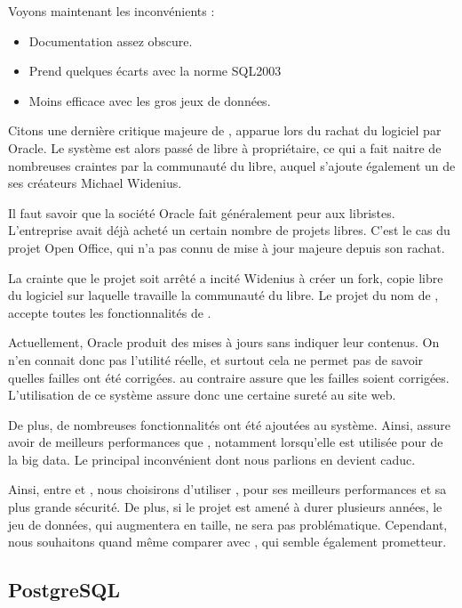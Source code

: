 Voyons maintenant les inconvénients :

\begin{itemize}
\item Documentation assez obscure. 
\item Prend quelques écarts avec la norme SQL2003
\item Moins efficace avec les gros jeux de données. 
\end{itemize} 

Citons une dernière critique majeure de \mysql, apparue lors du rachat du logiciel par Oracle. Le système est alors  passé de libre à propriétaire, ce qui  a fait naitre de nombreuses craintes par la communauté du libre, auquel s'ajoute également un de ses créateurs Michael Widenius. 

Il faut savoir que la société Oracle fait généralement peur aux libristes. L'entreprise avait déjà acheté un certain nombre de projets libres. C'est le cas du projet Open Office, qui n'a pas connu de mise à jour majeure depuis son rachat. 

La crainte que le projet soit arrêté a incité Widenius à créer un fork, copie libre du logiciel sur laquelle travaille la communauté du libre. Le projet du nom de \mdb, accepte toutes les fonctionnalités  de \mysql. 

Actuellement, Oracle produit des mises à jours sans indiquer leur contenus. On n'en connait donc pas l'utilité réelle, et surtout cela ne permet pas de savoir quelles failles ont été corrigées. \mdb au contraire assure que les failles soient corrigées. L'utilisation de ce système assure donc une certaine sureté au site web. 

De plus, de nombreuses fonctionnalités ont été ajoutées au système. Ainsi, \mdb assure avoir de meilleurs performances que \mysql, notamment lorsqu'elle est utilisée pour de la big data. Le principal inconvénient dont nous parlions en devient caduc. 

\medbreak

Ainsi, entre \mysql et \mdb, nous choisirons d'utiliser \mdb, pour ses meilleurs performances et sa plus grande sécurité. De plus, si le projet est amené à durer plusieurs années, le jeu de données, qui augmentera en taille, ne sera pas problématique. Cependant, nous souhaitons quand même comparer \mdb avec \psql, qui semble également prometteur. 


\subsection{PostgreSQL}

